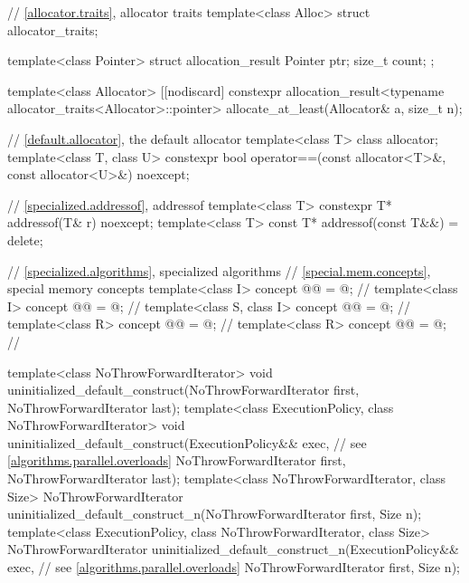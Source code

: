 \begin{codeblock}
{  // \ref{allocator.traits}, allocator traits
  template<class Alloc> struct allocator_traits;

  template<class Pointer>
  struct allocation_result {
    Pointer ptr;
    size_t count;
  };

  template<class Allocator>
    [[nodiscard] constexpr allocation_result<typename allocator_traits<Allocator>::pointer>
      allocate_at_least(Allocator& a, size_t n);

  // \ref{default.allocator}, the default allocator
  template<class T> class allocator;
  template<class T, class U>
    constexpr bool operator==(const allocator<T>&, const allocator<U>&) noexcept;

  // \ref{specialized.addressof}, addressof
  template<class T>
    constexpr T* addressof(T& r) noexcept;
  template<class T>
    const T* addressof(const T&&) = delete;

  // \ref{specialized.algorithms}, specialized algorithms
  // \ref{special.mem.concepts}, special memory concepts
  template<class I>
    concept @@ = @\seebelow@;    // \expos
  template<class I>
    concept @@ = @\seebelow@;  // \expos
  template<class S, class I>
    concept @@ = @\seebelow@;      // \expos
  template<class R>
    concept @@ = @\seebelow@;       // \expos
  template<class R>
    concept @@ = @\seebelow@;     // \expos

  template<class NoThrowForwardIterator>
    void uninitialized_default_construct(NoThrowForwardIterator first,
                                         NoThrowForwardIterator last);
  template<class ExecutionPolicy, class NoThrowForwardIterator>
    void uninitialized_default_construct(ExecutionPolicy&& exec,        // see \ref{algorithms.parallel.overloads}
                                         NoThrowForwardIterator first,
                                         NoThrowForwardIterator last);
  template<class NoThrowForwardIterator, class Size>
    NoThrowForwardIterator
      uninitialized_default_construct_n(NoThrowForwardIterator first, Size n);
  template<class ExecutionPolicy, class NoThrowForwardIterator, class Size>
    NoThrowForwardIterator
      uninitialized_default_construct_n(ExecutionPolicy&& exec,         // see \ref{algorithms.parallel.overloads}
                                        NoThrowForwardIterator first, Size n);

}
\end{codeblock}
